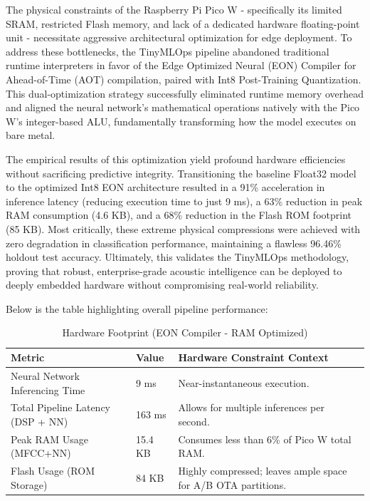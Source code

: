 \documentclass[11pt,a4paper,openany]{book}
\begin{document}
The physical constraints of the Raspberry Pi Pico W - specifically its limited SRAM, restricted Flash memory, and lack of a dedicated hardware floating-point unit - necessitate aggressive architectural optimization for edge deployment. To address these bottlenecks, the TinyMLOps pipeline abandoned traditional runtime interpreters in favor of the Edge Optimized Neural (EON) Compiler for Ahead-of-Time (AOT) compilation, paired with Int8 Post-Training Quantization. This dual-optimization strategy successfully eliminated runtime memory overhead and aligned the neural network's mathematical operations natively with the Pico W's integer-based ALU, fundamentally transforming how the model executes on bare metal.

The empirical results of this optimization yield profound hardware efficiencies without sacrificing predictive integrity. Transitioning the baseline Float32 model to the optimized Int8 EON architecture resulted in a 91\% acceleration in inference latency (reducing execution time to just 9 ms), a 63\% reduction in peak RAM consumption (4.6 KB), and a 68\% reduction in the Flash ROM footprint (85 KB). Most critically, these extreme physical compressions were achieved with zero degradation in classification performance, maintaining a flawless 96.46\% holdout test accuracy. Ultimately, this validates the TinyMLOps methodology, proving that robust, enterprise-grade acoustic intelligence can be deployed to deeply embedded hardware without compromising real-world reliability.

Below is the table highlighting overall pipeline performance:
\clearpage
\vspace{1em}
\begin{table}[!ht]
\centering
\caption{Hardware Footprint (EON Compiler - RAM Optimized)}
\label{tab:hardware_footprint}
\renewcommand{\arraystretch}{1.4}
\begin{tabular}{|l|l|p{7cm}|}
\hline
\textbf{Metric} & \textbf{Value} & \textbf{Hardware Constraint Context} \\ \hline
Neural Network Inferencing Time & 9 ms & Near-instantaneous execution. \\ \hline
Total Pipeline Latency (DSP + NN) & 163 ms & Allows for multiple inferences per second. \\ \hline
Peak RAM Usage (MFCC+NN) & 15.4 KB & Consumes less than 6\% of Pico W total RAM. \\ \hline
Flash Usage (ROM Storage) & 84 KB & Highly compressed; leaves ample space for A/B OTA partitions. \\ \hline
\end{tabular}
\end{table}
\end{document}
